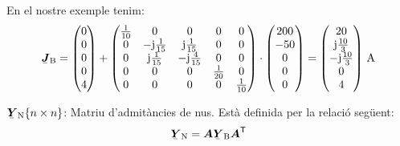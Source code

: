 \begin{list}{}
   En el nostre exemple tenim:
   \[
      \mcmplx{J}\ped{B} =
      \begin{pmatrix} 0 \\ 0 \\ 0 \\ 0 \\ 4 \end{pmatrix} +
      \begin{pmatrix}
            \frac{1}{10} & 0 & 0 & 0 & 0 \\
            0 & -\ju\frac{1}{15} & \ju\frac{1}{15} & 0 & 0 \\
            0 & \ju\frac{1}{15} & -\ju\frac{4}{15} & 0 & 0 \\
            0 & 0 & 0 & \frac{1}{20} & 0 \\
            0 & 0 & 0 & 0 & \frac{1}{10}
      \end{pmatrix} \cdot
      \begin{pmatrix} 200 \\ -50 \\ 0 \\ 0 \\ 0 \end{pmatrix} =
      \begin{pmatrix} 20 \\ \ju\frac{10}{3} \\ -\ju\frac{10}{3} \\ 0 \\ 4 \end{pmatrix}
     \unit{A}
   \]

   \item[$\mcmplx{Y}\ped{N}\{n\times n\}$:] Matriu d'admit\`{a}ncies de nus. Est\`{a} definida per la relaci\'{o} seg\"{u}ent:
   \begin{equation}
      \mcmplx{Y}\ped{N} = \boldsymbol{A} \mcmplx{Y}\ped{B}
      \transp{\boldsymbol{A}}
   \end{equation}


\end{list}
